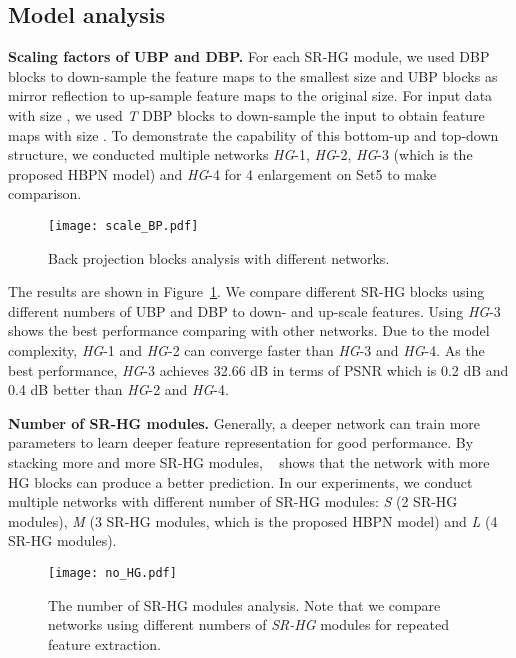 \documentclass[10pt,twocolumn,letterpaper]{article}
\begin{document}
\subsection{Model analysis}
\textbf{Scaling factors of UBP and DBP.} For each SR-HG module, we used DBP blocks to down-sample the feature maps to the smallest size and UBP blocks as mirror reflection to up-sample feature maps to the original size. For input data with size , we used \textit{T} DBP blocks to down-sample the input to obtain feature maps with size . To demonstrate the capability of this bottom-up and top-down structure, we conducted multiple networks \textit{HG}-1, \textit{HG}-2, \textit{HG}-3 (which is the proposed HBPN model) and \textit{HG}-4 for 4 enlargement on Set5 to make comparison.

\begin{figure}[h]
\vskip 0.01in
\begin{center}
\centerline{\texttt{[image: scale\_BP.pdf]}}
\caption{Back projection blocks analysis with different networks.}
\label{Figure 6}
\end{center}
\vskip -0.3in
\end{figure}

The results are shown in Figure~\ref{Figure 6}. We compare different SR-HG blocks using different numbers of UBP and DBP to down- and up-scale features. Using \textit{HG}-3 shows the best performance comparing with other networks. Due to the model complexity, \textit{HG}-1 and \textit{HG}-2 can converge faster than \textit{HG}-3 and \textit{HG}-4. As the best performance, \textit{HG}-3 achieves 32.66 dB in terms of PSNR which is 0.2 dB and 0.4 dB better than \textit{HG}-2 and \textit{HG}-4. 

\textbf{Number of SR-HG modules.} Generally, a deeper network can train more parameters to learn deeper feature representation for good performance. By stacking more and more SR-HG modules, ~\cite{DBPN} shows that the network with more HG blocks can produce a better prediction. In our experiments, we conduct multiple networks with different number of SR-HG modules: \textit{S} (2 SR-HG modules), \textit{M} (3 SR-HG modules, which is the proposed HBPN model) and \textit{L} (4 SR-HG modules). 

\begin{figure}[t]
\vskip 0.01in
\begin{center}
\centerline{\texttt{[image: no\_HG.pdf]}}
\caption{The number of SR-HG modules analysis. Note that we compare networks using different numbers of \textit{SR-HG} modules for repeated feature extraction.}
\label{Figure 7}
\end{center}
\vskip -0.3in
\end{figure}
\end{document}

